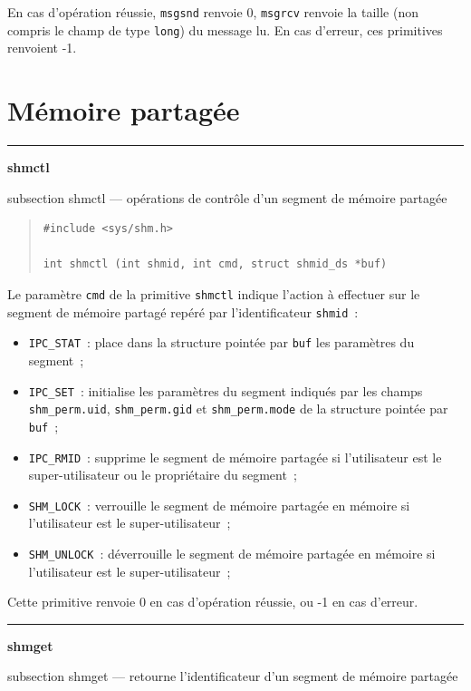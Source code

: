 \documentclass [twoside] {report}
\newcommand {\primitive} [1]
    {
	\phantomsection
	{\large \textbf {#1}}
	\addcontentsline {toc} {subsection} {#1}
    }
\newcommand {\separation}
    {
	\vspace {5mm}
	\nopagebreak
	\hrule
    }
\begin{document}
En cas d'opération réussie, \texttt {msgsnd} renvoie 0, \texttt {msgrcv} renvoie
la taille (non compris le champ de type \texttt {long}) du message lu.
En cas d'erreur, ces primitives renvoient -1.



\section* {Mémoire partagée}

\separation
\primitive {shmctl} --- opérations de contrôle d'un segment de mémoire partagée

\begin {quote}
\begin {verbatim}
#include <sys/shm.h>

int shmctl (int shmid, int cmd, struct shmid_ds *buf)
\end{verbatim}
\end {quote}

Le paramètre \texttt {cmd} de la primitive \texttt {shmctl} indique l'action à
effectuer sur le segment de mémoire partagé repéré par l'identificateur
\texttt {shmid}~:

\begin {itemize}
    \item \texttt {IPC\_STAT}~:  place dans la structure pointée par
	\texttt {buf} les paramètres du segment~;
    \item \texttt {IPC\_SET}~:  initialise les paramètres du segment
	indiqués par les champs \texttt {shm\_perm.uid}, \texttt {shm\_perm.gid}
	et \texttt {shm\_perm.mode} de la structure pointée par \texttt {buf}~;
    \item \texttt {IPC\_RMID}~:  supprime le segment de mémoire partagée si
	l'utilisateur est le super-utilisateur ou le propriétaire du
	segment~;
    \item \texttt {SHM\_LOCK}~:  verrouille le segment de mémoire partagée
	en mémoire si l'utilisateur est le super-utilisateur~;
    \item \texttt {SHM\_UNLOCK}~:  déverrouille le segment de mémoire
	partagée en mémoire si l'utilisateur est le super-utilisateur~;
\end {itemize}

Cette primitive renvoie 0 en cas d'opération
réussie, ou -1 en cas d'erreur.



\separation
\primitive {shmget} --- retourne l'identificateur d'un segment de mémoire partagée
\end{document}
